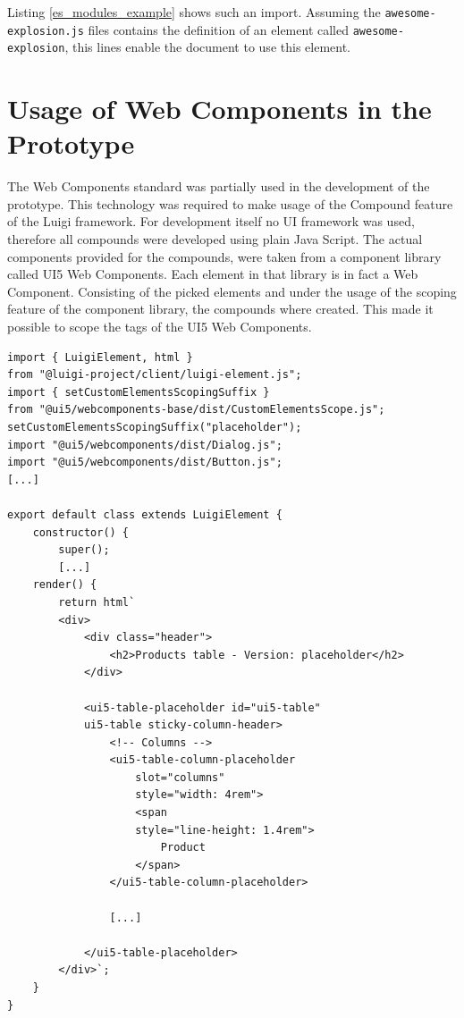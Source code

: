 Listing \ref{es_modules_example} shows such an import. Assuming the \texttt{awesome-explosion.js} files contains the definition of an element called \texttt{awesome-explosion}, this lines enable the document to use this element.\cite{wc_specifications}

\section{Usage of Web Components in the Prototype}

The Web Components standard was partially used in the development of the prototype. This technology was required to make usage of the Compound feature of the Luigi framework. \cite{luigi_wc} \cite{luigi_compound}
For development itself no UI framework was used, therefore all compounds were developed using plain Java Script. The actual components provided for the compounds, were taken from a component library called UI5 Web Components. Each element in that library is in fact a Web Component.\cite{ui5_wc_github}
Consisting of the picked elements and under the usage of the scoping feature of the component library, the compounds where created. This made it possible to scope the tags of the UI5 Web Components.\cite{ui5_webcomponents_scoping}

\begin{lstlisting}[caption=Scoping feature used in the prototype, label=scoping_wc_prototype]
import { LuigiElement, html } 
from "@luigi-project/client/luigi-element.js";
import { setCustomElementsScopingSuffix } 
from "@ui5/webcomponents-base/dist/CustomElementsScope.js";
setCustomElementsScopingSuffix("placeholder");
import "@ui5/webcomponents/dist/Dialog.js";
import "@ui5/webcomponents/dist/Button.js";
[...]

export default class extends LuigiElement {
	constructor() {
		super();
		[...]
	render() {
		return html`
		<div>
			<div class="header">
				<h2>Products table - Version: placeholder</h2>
			</div>
			
			<ui5-table-placeholder id="ui5-table" 
			ui5-table sticky-column-header>
				<!-- Columns -->
				<ui5-table-column-placeholder 
					slot="columns" 
					style="width: 4rem">
					<span 
					style="line-height: 1.4rem">
						Product
					</span>
				</ui5-table-column-placeholder>
				
				[...]
				
			</ui5-table-placeholder>
		</div>`;
	}
}
\end{lstlisting}

